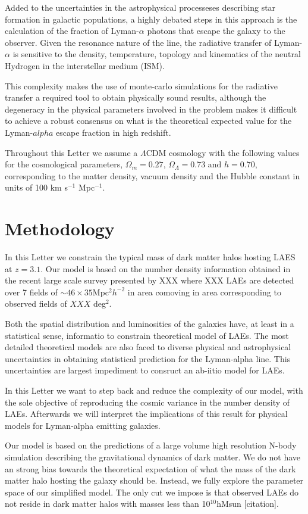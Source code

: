 \documentclass{emulateapj}
\begin{document}
Added to the uncertainties in the astrophysical processeses describing
star formation in galactic populations, a highly debated steps in this
approach is the calculation of the fraction of Lyman-$\alpha$ photons
that escape the galaxy to the observer. Given the resonance nature of
the line, the radiative transfer of Lyman-$\alpha$ is sensitive to the
density, temperature, topology and kinematics of the neutral Hydrogen
in the interstellar medium (ISM).  

This complexity makes the use of monte-carlo simulations for the
radiative transfer a required tool to obtain physically sound results,
although the degeneracy in the physical parameters involved in the
problem makes it difficult to achieve a robust consensus on what is
the theoretical expected value for the Lyman-$alpha$ escape fraction
in high redshift. 


Throughout this Letter we assume a $\Lambda$CDM cosmology with the
following values for the cosmological parameters, $\Omega_{m}=0.27$,
$\Omega_{\Lambda}=0.73$ and $h=0.70$, corresponding to the matter
density, vacuum density and the Hubble constant in units of 100 km
s$^{-1}$ Mpc$^{-1}$. 

\section{Methodology}
In this Letter we constrain the typical mass of dark matter halos
hosting LAES at $z=3.1$. Our model is based on the number density
information obtained in the recent large scale survey presented by XXX
where XXX LAEs are detected over 7 fields of $\sim 46 \times
35$Mpc$^{2}h^{-2}$ in area comoving in area corresponding to observed
fields of $XXX$ deg$^{2}$.  

Both the spatial distribution and luminosities of the galaxies have,
at least in a statistical sense, informatio to constrain theoretical
model of LAEs. The most detailed theoretical models are also faced to
diverse physical and astrophysical uncertainties in obtaining
statistical prediction for the Lyman-alpha line. This uncertainties
are largest impediment to consruct an ab-iitio model for LAEs.  

In this Letter we want to step back and reduce the complexity of our
model, with the sole objective of reproducing the cosmic variance in
the number density of LAEs. Afterwards we will interpret the
implications of this result for physical models for Lyman-alpha
emitting galaxies. 

Our model is based on the predictions of a large volume high
resolution N-body simulation describing the gravitational dynamics of
dark matter. We do not have an strong bias towards the theoretical
expectation of what the mass of the dark matter halo hosting the
galaxy should be.  Instead, we fully explore the parameter space of
our simplified model. The only cut we impose is that observed LAEs do
not reside in dark matter halos with masses less than 10$^{10}$hMsun
[citation].  
\end{document}
